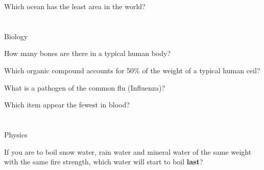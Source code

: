 \documentclass{../cie}
\begin{document}
  \begin{question}%
    Which ocean has the least area in the world?

    \setanswer
  \end{question}

  \section{}{Biology}

  \begin{question}%
    How many bones are there in a typical human body?

    \setanswer
  \end{question}

  \begin{question}%
    Which organic compound accounts for 50\% of the weight of a typical human ceil?

    \setanswer
  \end{question}

  \begin{question}%
    What is a pathogen of the common flu (Influenza)?

    \setanswer
  \end{question}

  \begin{question}%
    Which item appear the fewest in blood?

    \setanswer
  \end{question}

  \section{}{Physics}

  \begin{question}%
    If you are to boil snow water, rain water and mineral water of the same weight with the same fire strength, which water will start to boil \textbf{last}?

    \setanswer
  \end{question}
\end{document}
